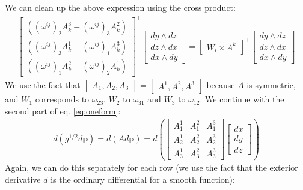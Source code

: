 \documentclass[../thesis.tex]{subfiles}
\begin{document}
We can clean up the above expression using the cross product:
\begin{align*}
  \begin{bmatrix}
    ((\omega^{ij})_2A^3_k - (\omega^{ij})_3A^2_k) \\
    ((\omega^{ij})_3A^1_k - (\omega^{ij})_1A^3_k) \\
    ((\omega^{ij})_1A^2_k - (\omega^{ij})_2A^1_k) 
  \end{bmatrix}^{\top}
  \begin{bmatrix}
    dy \wedge dz \\
    dz \wedge dx \\
    dx \wedge dy 
  \end{bmatrix} = 
  \begin{bmatrix}
    W_i \times A^k
  \end{bmatrix}^{\top}
  \begin{bmatrix}
    dy \wedge dz \\
    dz \wedge dx \\
    dx \wedge dy 
  \end{bmatrix}
\end{align*}
We use the fact that $\begin{bmatrix}
  A_1, A_2, A_3 
\end{bmatrix} = \begin{bmatrix}
  A^1, A^2, A^3
\end{bmatrix}$ because $A$ is symmetric, and $W_1$ corresponds to $\omega_{23}$, $W_2$ to $\omega_{31}$ and $W_3$ to $\omega_{12}$.
We continue with the second part of eq. \ref{eq:oneform}:
\begin{align*}
  d(g^{1/2}d\bm{p})= d(Ad\bm{p}) = d\left(\begin{bmatrix}
    A^1_1 & A^2_1 & A^3_1 \\
    A^1_2 & A^2_2 & A^3_2 \\
    A^1_3 & A^2_3 & A^3_3
  \end{bmatrix}
  \begin{bmatrix}
    dx \\ dy \\ dz
  \end{bmatrix}
  \right)
\end{align*}
Again, we can do this separately for each row (we use the fact that the exterior derivative $d$ is the ordinary differential for a smooth function):
\end{document}
